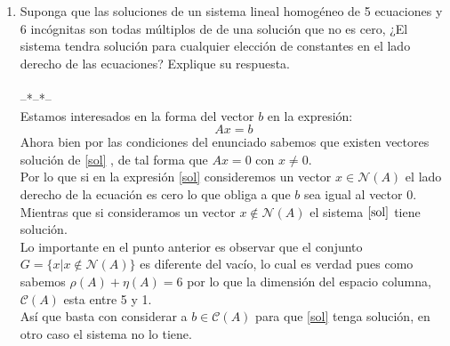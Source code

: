 \documentclass[letter]{memoir} %
\begin{document}
\begin{enumerate}
\item Suponga que las soluciones de un sistema lineal homogéneo de 5 ecuaciones y 6 incógnitas son todas múltiplos de de una solución que no es cero, ¿El sistema tendra solución para cualquier elección de constantes en el lado derecho de las ecuaciones? Explique su respuesta.\\\\
--*--*--\\
Estamos interesados en la forma del vector $b$ en la expresión:\\
\begin{equation}\label{sol}
Ax = b
\end{equation}
Ahora bien por las condiciones del enunciado sabemos que existen vectores solución de \ref{sol} , de tal forma que $Ax = 0$ con $x\ne 0$.\\
Por lo que si en la expresión \ref{sol} consideremos un vector $x \in \mathcal{N}(A)$ el lado derecho de la ecuación es cero lo que obliga a que $b$ sea igual al vector 0. \\
Mientras que si consideramos un vector $x \notin \mathcal{N}(A)$ el sistema $\ref{sol}$ tiene solución.\\
Lo importante en el punto anterior es observar que el conjunto $G = \{x| x \notin \mathcal{N}(A) \}$ es diferente del vacío, lo cual es verdad pues como sabemos $\rho(A) + \eta(A) = 6$ por lo que la dimensión del espacio columna, $\mathcal{C}(A)$ esta entre 5 y 1.\\
Así que basta con considerar a $b \in \mathcal{C}(A)$ para que \ref{sol} tenga solución, en otro caso el sistema no lo tiene. 



\end{enumerate}
\end{document}
